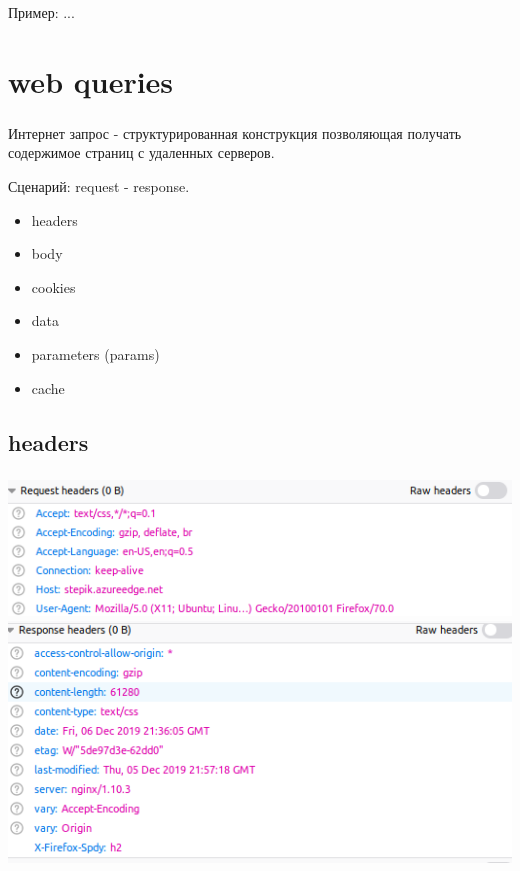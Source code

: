 \documentclass[t, 11pt]{beamer}
\begin{document}
\begin{frame}
	\frametitle{\insertsection}
	\frametitle{\insertsubsection} 
	Пример: 
... 
\end{frame}


\section{web queries}

\begin{frame}
	\frametitle{\insertsection}
	\frametitle{\insertsubsection}  
	Интернет запрос - структурированная конструкция позволяющая получать содержимое страниц с удаленных серверов. 
	
	Сценарий: request - response. 
\begin{itemize}
	\item headers
	\item body
	\item cookies
	\item data 
	\item parameters (params)
	\item cache
	\end{itemize}
\end{frame}


\subsection{headers}

\begin{frame}
	\frametitle{\insertsection}
	\frametitle{\insertsubsection}  
\includegraphics[width=0.8\linewidth]{head.png}
\includegraphics[width=0.8\linewidth]{head_res.png}
\end{frame}
\end{document}
